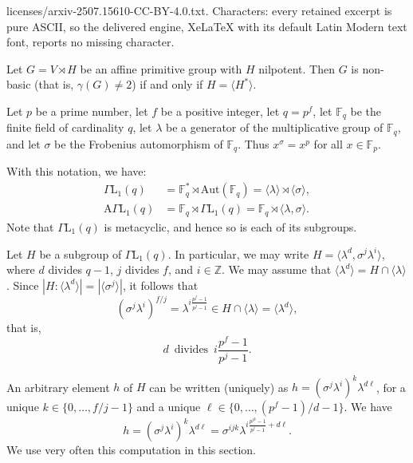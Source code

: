 \documentclass[10pt,a4paper]{amsart}
\begin{document}
licenses/arxiv-2507.15610-CC-BY-4.0.txt. Characters: every retained excerpt is pure ASCII, so the delivered engine, XeLaTeX with its default Latin Modern text font, reports no missing character.
\begin{lemma}\label{lemma:mercoledi0}
Let $G=V\rtimes H$ be an affine primitive group with $H$ nilpotent. Then $G$ is non-basic (that is, $\gamma(G)\ne 2$) if and only if $H=\langle H^\ast\rangle$.
\end{lemma}

\begin{notation}\label{not}{\rm
Let $p$ be a prime number, let $f$ be a positive integer, let $q = p^f$, let $\mathbb{F}_q$ be the finite field of cardinality $q$, let $\lambda$ be a generator of the multiplicative group of $\mathbb{F}_q$, and let $\sigma$ be the Frobenius automorphism of $\mathbb{F}_q$. Thus $x^\sigma = x^p$ for all $x \in \mathbb{F}_p$.

With this notation, we have:
\begin{align*}
\Gamma\mathrm{L}_1(q) &= \mathbb{F}_q^\ast \rtimes \mathrm{Aut}(\mathbb{F}_q) = \langle \lambda \rangle \rtimes \langle \sigma \rangle,\\
\mathrm{A}\Gamma\mathrm{L}_1(q) &= \mathbb{F}_q \rtimes \Gamma\mathrm{L}_1(q) = \mathbb{F}_q \rtimes \langle \lambda, \sigma \rangle.
\end{align*}
Note that $\Gamma\mathrm{L}_1(q)$ is metacyclic, and hence so is each of its subgroups.

Let $H$ be a subgroup of $\Gamma\mathrm{L}_1(q)$. In particular, we may write $H = \langle \lambda^d, \sigma^j \lambda^i \rangle$, where $d$ divides $q - 1$, $j$ divides $f$, and $i \in \mathbb{Z}$. We may assume that $\langle \lambda^d \rangle = H \cap \langle \lambda \rangle$. Since $|H : \langle \lambda^d \rangle| = |\langle \sigma^j \rangle|$, it follows that
$$(\sigma^j\lambda^i)^{f/j} = \lambda^{i\frac{p^f - 1}{p^j - 1}} \in H \cap \langle \lambda \rangle = \langle \lambda^d \rangle,$$
that is,
\begin{equation}\label{eq:neq1}
d\, \text{ divides }\, i\frac{p^f - 1}{p^j - 1}.
\end{equation}

An arbitrary element $h$ of $H$ can be written (uniquely) as $h=(\sigma^j\lambda^i)^k\lambda^{d\ell}$, for a unique $k\in \{0,\ldots,f/j-1\}$ and a unique $\ell\in \{0,\ldots,(p^f-1)/d-1\}$. We have
\begin{equation}\label{often}
h=(\sigma^j\lambda^i)^k\lambda^{d\ell}=\sigma^{ijk}\lambda^{i\frac{p^{jk}-1}{p^j-1}+d\ell}.
\end{equation}
We use very often this computation in this section.
}
\end{notation}
\end{document}
